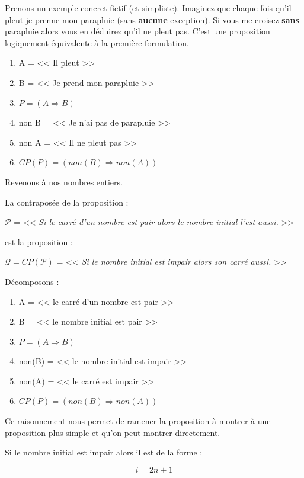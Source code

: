 \documentclass[a4paper,11pt]{book}
\begin{document}
Prenons un exemple concret fictif (et simpliste). Imaginez que
chaque fois qu'il pleut je prenne mon parapluie (sans \textbf{aucune}
exception). Si vous me croisez \textbf{sans} parapluie alors vous en
déduirez qu'il ne pleut pas. C'est une proposition logiquement
équivalente à la première formulation.

\begin{enumerate}
\item A = << Il pleut >>
\item B = << Je prend mon parapluie >>
\item \(P = (A\Rightarrow B)\)
\item non B = << Je n'ai pas de parapluie >>
\item non A = << Il ne pleut pas >>
\item \(CP(P) = \left(non(B)\Rightarrow non(A)\right)\)
\end{enumerate}


Revenons à nos nombres entiers.

La contraposée de la proposition :

\(\mathcal{P}\) = << \emph{Si le carré d'un nombre est pair alors le nombre
initial l'est aussi.} >>


est la proposition :

\(\mathcal{Q} = CP(\mathcal{P})\) = << \emph{Si le nombre initial est
impair alors son carré aussi.} >>



Décomposons :

\begin{enumerate}
\item A = << le carré d'un nombre est pair >>
\item B = << le nombre initial est pair >>
\item \(P = (A \Rightarrow B)\)
\item non(B) = << le nombre initial est impair >>
\item non(A) = << le carré est impair >>
\item \(CP(P) = \left(non(B)\Rightarrow non(A)\right)\)
\end{enumerate}


Ce raisonnement nous permet de ramener la proposition à montrer à
une proposition plus simple et qu'on peut montrer directement.

Si le nombre initial est impair alors il est de la forme :

\[i = 2n + 1\]
\end{document}
